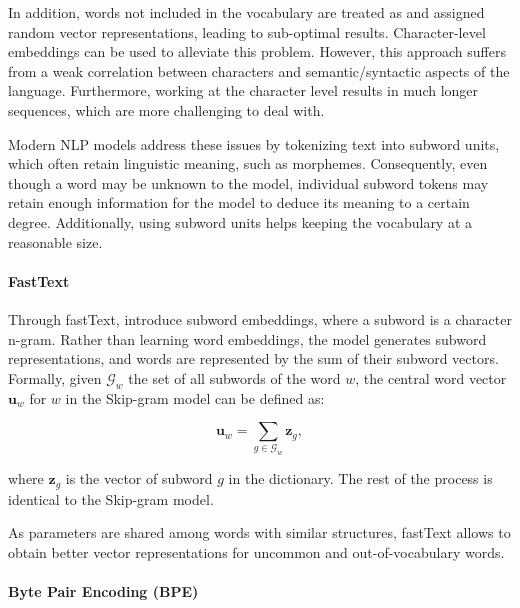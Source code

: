 In addition, words not included in the vocabulary are treated as  and assigned random vector representations, leading to sub-optimal results. Character-level embeddings \citep{wehrmann2017character} can be used to alleviate this problem. However, this approach suffers from a weak correlation between characters and semantic/syntactic aspects of the language. Furthermore, working at the character level results in much longer sequences, which are more challenging to deal with.

Modern NLP models address these issues by tokenizing text into subword units, which often retain linguistic meaning, such as morphemes. Consequently, even though a word may be unknown to the model, individual subword tokens may retain enough information for the model to deduce its meaning to a certain degree. Additionally, using subword units helps keeping the vocabulary at a reasonable size.

\paragraph{FastText} Through fastText, \citet{bojanowski2017enriching} introduce subword embeddings, where a subword is a character n-gram. Rather than learning word embeddings, the model generates subword representations, and words are represented by the sum of their subword vectors. Formally, given $\mathcal{G}_w$ the set of all subwords of the word $w$, the central word vector $\bm{u}_w$ for $w$ in the Skip-gram model can be defined as:

\begin{equation}
    \bm{u}_w = \sum_{g \in \mathcal{G}_w} \bm{z}_g,
\end{equation}

where $\bm{z}_g$ is the vector of subword $g$ in the dictionary. The rest of the process is identical to the Skip-gram model.

As parameters are shared among words with similar structures, fastText allows to obtain better vector representations for uncommon and out-of-vocabulary words.

\paragraph{Byte Pair Encoding (BPE)}

